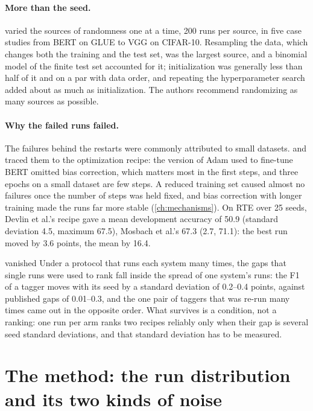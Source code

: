 \begin{refsection}
\paragraph{More than the seed.} \Textcite{BouthillierEtAl2021} varied the sources of randomness one at a time, 200 runs per source, in five case studies from BERT on GLUE to VGG on CIFAR-10. Resampling the data, which changes both the training and the test set, was the largest source, and a binomial model of the finite test set accounted for it; initialization was generally less than half of it and on a par with data order, and repeating the hyperparameter search added about as much as initialization. The authors recommend randomizing as many sources as possible.

\paragraph{Why the failed runs failed.} The failures behind the restarts were commonly attributed to small datasets. \Textcite{MosbachEtAl2021} and \textcite{ZhangEtAl2021} traced them to the optimization recipe: the version of Adam used to fine-tune BERT omitted bias correction, which matters most in the first steps, and three epochs on a small dataset are few steps. A reduced training set caused almost no failures once the number of steps was held fixed, and bias correction with longer training made the runs far more stable (\cref{ch:mechanisms}). On RTE over 25 seeds, Devlin et al.'s recipe gave a mean development accuracy of 50.9 (standard deviation 4.5, maximum 67.5), Mosbach et al.'s 67.3 (2.7, 71.1): the best run moved by 3.6 points, the mean by 16.4.

\begin{verdict}{vanished}
Under a protocol that runs each system many times, the gaps that single runs were used to rank fall inside the spread of one system's runs: the F1 of a tagger moves with its seed by a standard deviation of 0.2--0.4 points, against published gaps of 0.01--0.3, and the one pair of taggers that was re-run many times came out in the opposite order. What survives is a condition, not a ranking: one run per arm ranks two recipes reliably only when their gap is several seed standard deviations, and that standard deviation has to be measured.
\end{verdict}

\section{The method: the run distribution and its two kinds of noise}\label{sec:seeds:distribution}


\end{refsection}
